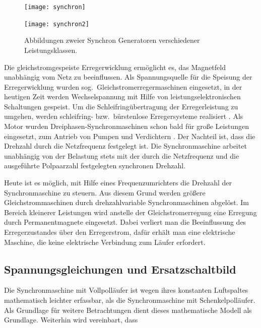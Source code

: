\begin{figure}[h!]
\centering
\begin{minipage}{6cm}
\texttt{[image: synchron]}
\end{minipage}
\hfill
\begin{minipage}{6cm}
\texttt{[image: synchron2]}
\end{minipage}
\caption{Abbildungen zweier Synchron Generatoren verschiedener Leistungsklassen.}
\label{fig:synchron-generatoren}
\end{figure}

Die gleichstromgespeiste Erregerwicklung ermöglicht es, das Magnetfeld unabhängig vom Netz zu beeinflussen.
Als Spannungsquelle für die Speisung der Erregerwicklung wurden sog.\ Gleichstromerregermaschinen eingesetzt, in der heutigen Zeit werden Wechselspannung mit Hilfe von leistungselektronischen Schaltungen gespeist.
Um die Schleifringübertragung der Erregerleistung zu umgehen, werden schleifring- bzw.\ bürstenlose Erregersysteme realisiert \autocite{fischer2009}.
Als Motor wurden Dreiphasen-Synchronmaschinen schon bald für große Leistungen eingesetzt, \zB zum Antrieb von Pumpen und Verdichtern \autocite[S.~486]{mullerI2005}.
Der Nachteil ist, dass die Drehzahl durch die Netzfrequenz festgelegt ist.
Die Synchronmaschine arbeitet unabhängig von der Belastung stets mit der durch die Netzfrequenz und die ausgeführte Polpaarzahl festgelegten synchronen Drehzahl.

Heute ist es möglich, mit Hilfe eines Frequenzumrichters die Drehzahl der Synchronmaschine zu steuern.
Aus diesem Grund werden größere Gleichstrommaschinen durch drehzahlvariable Synchronmaschinen abgelöst.
Im Bereich kleinerer Leistungen wird anstelle der Gleichstromerregung eine Erregung durch Permanentmagnete eingesetzt.
Dabei verliert man die Beeinflussung des Erregerzustandes über den Erregerstrom, dafür erhält man eine elektrische Maschine, die keine elektrische Verbindung zum Läufer erfordert.

\subsection{Spannungsgleichungen und Ersatzschaltbild}\label{sec:spannungsgleichung-esb}

Die Synchronmaschine mit Vollpolläufer ist wegen ihres konstanten Luftspaltes mathematisch leichter erfassbar, als die Synchronmaschine mit Schenkelpolläufer.
Als Grundlage für weitere Betrachtungen dient dieses mathematische Modell als Grundlage.
Weiterhin wird vereinbart, dass

